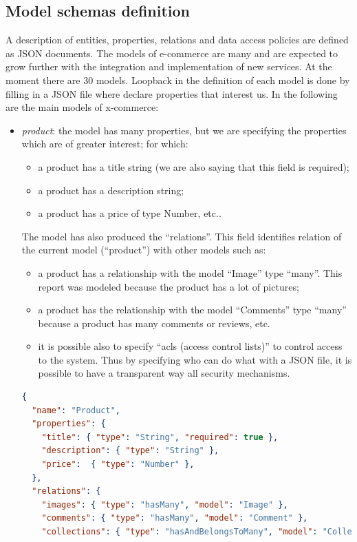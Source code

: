 \subsection{Model schemas definition}
A description of entities, properties, relations and data access policies are defined as JSON documents.
\newline
The models of e-commerce are many and are expected to grow further with the integration and implementation of new services. At the moment there are 30 models. Loopback in the definition of each model is done by filling in a JSON file where declare properties that interest us. In the following are the main models of x-commerce:
\begin{itemize}
\item \emph{product}: the model has many properties, but we are specifying the properties which are of greater interest; for which:
\begin{itemize}
\item a product has a title string (we are also saying that this field is required);
\item a product has a description string;
\item a product has a price of type Number, etc..
\end{itemize}
The model has also produced the “relations”. This field identifies relation of the current model (“product”) with other models such as:
\begin{itemize}
\item a product has a relationship with the model “Image” type “many”. This report was modeled because the product has a lot of pictures;
\item a product has the relationship with the model “Comments” type “many” because a product has many comments or reviews, etc.
\item it is possible also to specify “acls (access control lists)” to control access to the system. Thus by specifying who can do what with a JSON file, it is possible to have a transparent way all security mechanisms.
\end{itemize}
\begin{lstlisting}[language=json]
{
  "name": "Product",
  "properties": {
    "title": { "type": "String", "required": true },
    "description": { "type": "String" },
    "price":  { "type": "Number" },
  },
  "relations": {
    "images": { "type": "hasMany", "model": "Image" },
    "comments": { "type": "hasMany", "model": "Comment" },
    "collections": { "type": "hasAndBelongsToMany", "model": "Collection" },

\end{lstlisting}
\end{itemize}

